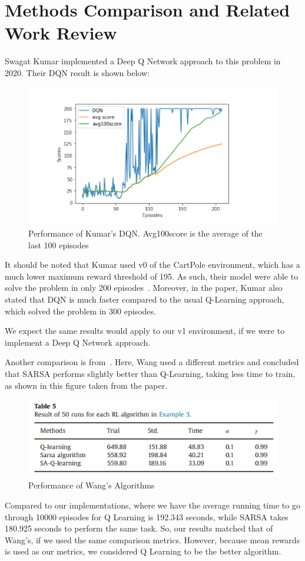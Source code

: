 \section{Methods Comparison and Related Work Review}

Swagat Kumar implemented a Deep Q Network approach to this problem in 2020.
Their DQN result is shown below:

\begin{figure}[H] %
    \centering
    \includegraphics[width=0.75\linewidth]{kumar-2020-dqn.png}
    \caption{Performance of Kumar's DQN. Avg100score is the average of the last 100 episodes}
\end{figure}

It should be noted that Kumar used v0 of the CartPole environment, which has a much lower maximum reward threshold of 195. As such,
their model were able to solve the problem in only 200 episodes~\citep{kumar2020balancing}. Moreover, in the paper, Kumar also stated that
DQN is much faster compared to the usual Q-Learning approach, which solved the problem in 300 episodes.

We expect the same results would apply to our v1 environment, if we were to implement a Deep Q Network approach.

Another comparison is from~\citep{wang2013backward}. Here, Wang used a different metrics and concluded that SARSA performs slightly better than Q-Learning, taking less time to train, as shown
in this figure taken from the paper.

\begin{figure}[H] %
    \centering
    \includegraphics[width=0.75\linewidth]{wang-table.png}
    \caption{Performance of Wang's Algorithms}
\end{figure}

Compared to our implementations, where we have the average running time to go through 10000 episodes for Q Learning is 192.343 seconds, while SARSA takes 180.925 seconds to perform the same task.
So, our results matched that of Wang's, if we used the same comparison metrics. However, because mean rewards is used as our metrics, we considered Q Learning to be the better algorithm.